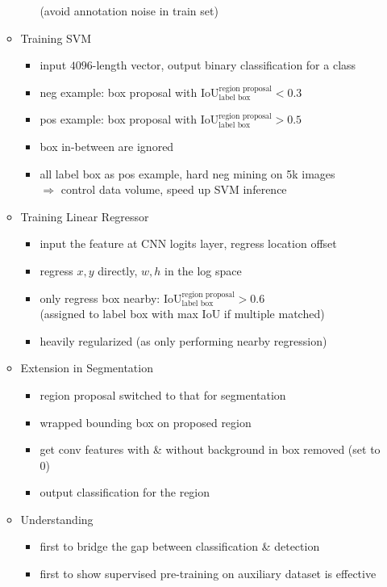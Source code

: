 \begin{itemize}
\begin{itemize}
\begin{itemize}
		(avoid annotation noise in train set)
		\end{itemize}
	\item Training SVM
		\begin{itemize}
		\item input $4096$-length vector, output binary classification for a class
		\item neg example: box proposal with $\text{IoU}^\text{region proposal}_\text{label box} < 0.3$
		\item pos example: box proposal with $\text{IoU}^\text{region proposal}_\text{label box} > 0.5$
		\item box in-between are ignored
		\item all label box as pos example, hard neg mining on 5k images \\
		$\Rightarrow$ control data volume, speed up SVM inference
		\end{itemize}
	\item Training Linear Regressor
		\begin{itemize}
		\item input the feature at CNN logits layer, regress location offset
		\item regress $x,y$ directly, $w,h$ in the log space
		\item only regress box nearby:  $\text{IoU}^\text{region proposal}_\text{label box} > 0.6$ \\
		(assigned to label box with max IoU if multiple matched)
		\item heavily regularized (as only performing nearby regression)
		\end{itemize}
	\item Extension in Segmentation
		\begin{itemize}
		\item region proposal switched to that for segmentation
		\item wrapped bounding box on proposed region
		\item get conv features with \& without background in box removed (set to $0$)
		\item output classification for the region
		\end{itemize}
	\item Understanding
		\begin{itemize}
		\item first to bridge the gap between classification \& detection
		\item first to show supervised pre-training on auxiliary dataset is effective \\

\end{itemize}
\end{itemize}
\end{itemize}
